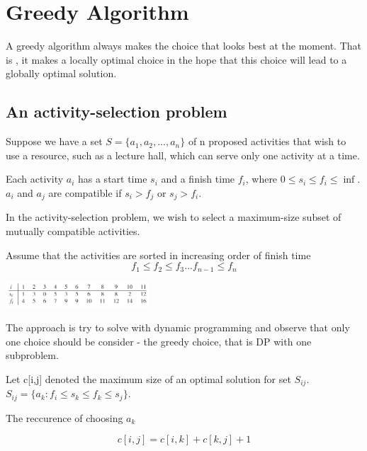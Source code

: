 \section{Greedy Algorithm}

    A greedy algorithm always makes the choice that looks best at the moment.
    That is , it makes a locally optimal choice in the hope that this choice
    will lead to a globally optimal solution.

\subsection{An activity-selection problem}

    Suppose we have a set $S=\lbrace a_1,a_2,...,a_n \rbrace$
    of n proposed activities that wish to use a resource, 
    such as a lecture hall, which
    can serve only one activity at a time.

    Each activity $a_i$ has a start time $s_i$ and a finish time $f_i$,
    where $0\leq s_i \leq f_i \leq \inf$. $a_i$ and $a_j$ are 
    compatible if $s_i > f_j$ or $s_j > f_i$.

    In the activity-selection problem, we wish to select a maximum-size
    subset of mutually compatible activities.

    Assume that the activities are sorted in increasing order of finish time
    \begin{equation*}
        f_1 \leq f_2 \leq f_3 ... f_{n-1} \leq f_n
    \end{equation*}

    \includegraphics[width=0.4\textwidth]{contents/Advanced_Design/Greedy/greedy_image/sorted_finish_time.png}


    The approach is try to solve with dynamic programming and observe that 
    only one choice should be consider - the greedy choice, that is 
    DP with one subproblem.

    Let c[i,j] denoted the maximum size of an optimal solution for set $S_{ij}$.
    $S_{ij}=\lbrace a_k: f_i \leq s_k \leq f_k \leq s_j  \rbrace$.

    The reccurence of choosing $a_k$

    \begin{equation*}
        c[i,j] = c[i,k] + c[k,j] + 1
    \end{equation*}

